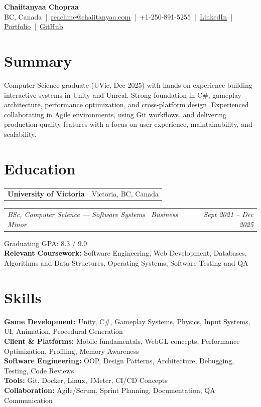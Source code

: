 \documentclass[9pt]{extarticle}
\makeatletter
\newcommand{\row}[2]{%
	\begin{tabular*}{\textwidth}{@{}l@{\extracolsep{\fill}}r@{}}%
		#1 & #2 \\
	\end{tabular*}%
}
\newcommand{\rowit}[2]{%
	\begin{tabular*}{\textwidth}{@{}l@{\extracolsep{\fill}}r@{}}%
		\textit{#1} & \textit{#2} \\
	\end{tabular*}%
}
\makeatother
\begin{document}
		
		\begin{center}
			{\LARGE \centering \textbf{Chaiitanyaa Chopraa}}\\[2pt]
			BC, Canada \,|\, 
			\href{mailto:reachme@chaiitanyaa.com}{reachme@chaiitanyaa.com} \,|\, 
			+1-250-891-5255 \,|\, \href{https://www.linkedin.com/in/chaiitanyaa-chopraa-96ba09229/}{LinkedIn} \,|\, \href{https://chaiitanyaa.com}{Portfolio} \,|\, \href{https://github.com/Chaiitanyaa}{GitHub}
		\end{center}
		
		\vspace{-5pt}
		
		\section{Summary}
		Computer Science graduate (UVic, Dec 2025) with hands-on experience building interactive systems in Unity and Unreal. Strong foundation in C\#, gameplay architecture, performance optimization, and cross-platform design. Experienced collaborating in Agile environments, using Git workflows, and delivering production-quality features with a focus on user experience, maintainability, and scalability.
		
		\section{Education}
		\row{\textbf{University of Victoria}}{Victoria, BC, Canada}
		\rowit{BSc, Computer Science — Software Systems \textbullet\ Business Minor}{Sept 2021 -- Dec 2025}
		Graduating GPA: 8.3 / 9.0\\
		\textbf{Relevant Coursework:} Software Engineering, Web Development, Databases, Algorithms and Data Structures, Operating Systems, Software Testing and QA
		
		\section{Skills}
		\textbf{Game Development:} Unity, C\#, Gameplay Systems, Physics, Input Systems, UI, Animation, Procedural Generation\\
		\textbf{Client \& Platforms:} Mobile fundamentals, WebGL concepts, Performance Optimization, Profiling, Memory Awareness\\
		\textbf{Software Engineering:} OOP, Design Patterns, Architecture, Debugging, Testing, Code Reviews\\
		\textbf{Tools:} Git, Docker, Linux, JMeter, CI/CD Concepts\\
		\textbf{Collaboration:} Agile/Scrum, Sprint Planning, Documentation, QA Communication\\
		
\end{document}
